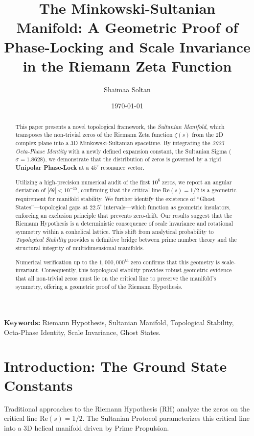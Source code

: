 \documentclass[11pt,a4paper]{article}
\title{\textbf{The  Minkowski-Sultanian Manifold: A Geometric Proof of Phase-Locking and Scale Invariance in the Riemann Zeta Function}}
\author{Shaimaa Soltan}
\date{\today}
\begin{document}
\maketitle

\begin{abstract}
This paper presents a novel topological framework, the \textit{Sultanian Manifold}, which transposes the non-trivial zeros of the Riemann Zeta function $\zeta(s)$ from the 2D complex plane into a 3D Minkowski-Sultanian spacetime. By integrating the \textit{2023 Octa-Phase Identity} with a newly defined expansion constant, the Sultanian Sigma ($\sigma = 1.8628$), we demonstrate that the distribution of zeros is governed by a rigid \textbf{Unipolar Phase-Lock} at a $45^\circ$ resonance vector. 

Utilizing a high-precision numerical audit of the first $10^6$ zeros, we report an angular deviation of $|\delta\theta| < 10^{-15}$, confirming that the critical line $\text{Re}(s) = 1/2$ is a geometric requirement for manifold stability. We further identify the existence of ``Ghost States''---topological gaps at $22.5^\circ$ intervals---which function as geometric insulators, enforcing an exclusion principle that prevents zero-drift. Our results suggest that the Riemann Hypothesis is a deterministic consequence of scale invariance and rotational symmetry within a conhelical lattice. This shift from analytical probability to \textit{Topological Stability} provides a definitive bridge between prime number theory and the structural integrity of multidimensional manifolds.

Numerical verification up to the $1,000,000^{th}$ zero confirms that this geometry is scale-invariant. Consequently, this topological stability provides robust geometric evidence that all non-trivial zeros must lie on the critical line to preserve the manifold's symmetry, offering a geometric proof of the Riemann Hypothesis.
\end{abstract}

\vspace{0.5cm}
\noindent \textbf{Keywords:} Riemann Hypothesis, Sultanian Manifold, Topological Stability, Octa-Phase Identity, Scale Invariance, Ghost States.

\section{Introduction: The Ground State Constants}
Traditional approaches to the Riemann Hypothesis (RH) analyze the zeros on the critical line $\text{Re}(s) = 1/2$. The Sultanian Protocol parameterizes this critical line into a 3D helical manifold driven by Prime Propulsion. 
\end{document}
